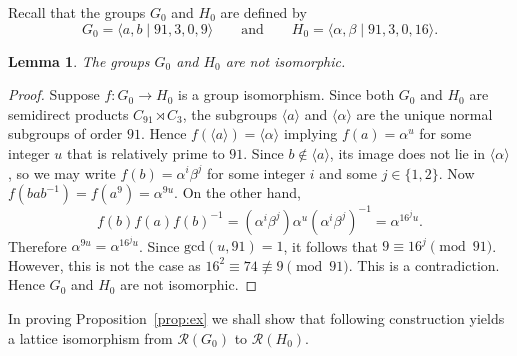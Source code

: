 \documentclass[a4paper,12pt]{article}
\newtheorem{lem}[thm]{Lemma}
\theoremstyle{definition}
\theoremstyle{remark}
\begin{document}
Recall that the groups $G_0$ and $H_0$ are defined by
$$ G_0 = \langle a,b\mid 91,3,0,9\rangle\qquad \text{and}\qquad H_0 = \langle \alpha,\beta\mid 91,3,0,16\rangle. $$

\begin{lem}\label{lem:g0h0}
  The groups $G_0$ and $H_0$ are not isomorphic.
\end{lem}

\begin{proof}
  Suppose $f\colon G_0\to H_0$ is a group isomorphism. Since both $G_0$ and $H_0$ are semidirect products $C_{91}\rtimes C_3$, the subgroups $\langle a \rangle$ and $\langle \alpha \rangle$ are the unique normal subgroups of order $91$. Hence $f(\langle a \rangle)=\langle \alpha \rangle$ implying $f(a) = \alpha^u$ for some integer $u$ that is relatively prime to $91$. Since $b\notin \langle a \rangle$, its image does not lie in $\langle \alpha\rangle$, so we may write $f(b) = \alpha^i\beta^j$ for some integer $i$ and some $j\in \{1,2\}$. Now $f(bab^{-1}) = f(a^9) = \alpha^{9u}$. On the other hand,
  $$ f(b)f(a)f(b)^{-1} = (\alpha^i\beta^j)\alpha^u(\alpha^i\beta^j)^{-1} = \alpha^{16^ju}. $$
  Therefore $\alpha^{9u}=\alpha^{16^ju}$. Since $\mathrm{gcd}(u,91)=1$, it follows that $9\equiv 16^j\pmod{91}$. However, this is not the case as $16^2\equiv 74\not\equiv 9\pmod{91}$. This is a contradiction. Hence $G_0$ and $H_0$ are not isomorphic.
\end{proof}

In proving Proposition~\ref{prop:ex} we shall show that following construction yields a lattice isomorphism from $\mathcal{R}(G_0)$ to $\mathcal{R}(H_0)$.
\end{document}
